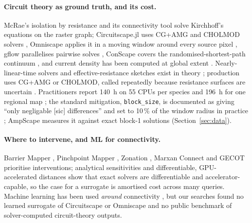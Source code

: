 \documentclass{article}
\newcommand{\code}[1]{\texttt{#1}}
\begin{document}
\paragraph{Circuit theory as ground truth, and its cost.} McRae's isolation by resistance \citep{mcrae2006} and its connectivity tool \citep{mcrae2008} solve Kirchhoff's equations on the raster graph; Circuitscape.jl uses CG+AMG and CHOLMOD solvers \citep{anantharaman2020,hall2021}, Omniscape applies it in a moving window around every source pixel \citep{mcrae2016,landau2021}, gflow parallelises pairwise solves \citep{leonard2017}, ConScape covers the randomised-shortest-path continuum \citep{vanmoorter2023,panzacchi2016}, and current density has been computed at global extent \citep{brennan2022}. Nearly-linear-time solvers and effective-resistance sketches exist in theory \citep{koutis2010,spielman2011}; production uses CG+AMG or CHOLMOD, called repeatedly because resistance surfaces are uncertain \citep{zeller2012,peterman2018,hanks2013,bowman2020}. Practitioners report 140~h on 55 CPUs per species \citep{dertien2023} and 196~h for one regional map \citep{heckford2026}; the standard mitigation, \code{block\_size}, is documented as giving ``only negligable [sic] differences'' \citep{omniscapedocs} and set to 10\,\% of the window radius in practice \citep{belote2022}; AmpScape measures it against exact block-1 solutions (Section~\ref{sec:data}).

\paragraph{Where to intervene, and ML for connectivity.} Barrier Mapper \citep{mcrae2012}, Pinchpoint Mapper \citep{linkagemapper}, Zonation \citep{moilanen2005,moilanen2022}, Marxan Connect \citep{daigle2020} and GECOT \citep{hamonic2025} prioritise interventions; analytical sensitivities \citep{vanmoorter2026} and differentiable, GPU-accelerated distances \citep{boussange2025} show that exact solvers are differentiable and accelerator-capable, so the case for a surrogate is amortised cost across many queries. Machine learning has been used \emph{around} connectivity \citep{equihua2024,smith2023}, but our searches found no learned surrogate of Circuitscape or Omniscape and no public benchmark of solver-computed circuit-theory outputs.
\end{document}
